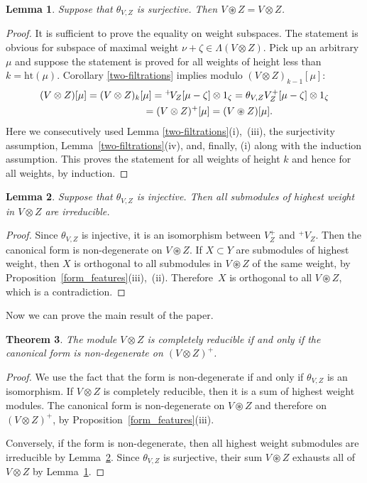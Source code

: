 \documentclass[pdftex]{sigma}
\numberwithin{equation}{section}
\newtheorem{Theorem}{Theorem}[section]
\newtheorem{Lemma}[Theorem]{Lemma}
\begin{document}
\begin{Lemma}\label{ext-tw-decomp}Suppose that $\theta_{V,Z}$ is surjective. Then $V\circledast Z=V\otimes Z$.
\end{Lemma}
\begin{proof} It is sufficient to prove the equality on weight subspaces. The statement is obvious for subspace of maximal weight $\nu+\zeta\in \Lambda(V\otimes Z)$. Pick up an arbitrary $\mu$ and suppose the statement is proved for all weights of height less than $k=\mathrm{ht}(\mu)$. Corollary \ref{two-filtrations} implies modulo $(V\otimes Z)_{k-1}[\mu]$:
\begin{gather*}
(V\otimes Z)[\mu]=(V\otimes Z)_k[\mu]={}^+\!V_Z[\mu-\zeta]\otimes 1_\zeta=\theta_{V,Z}V^+_Z[\mu-\zeta]\otimes 1_\zeta\\
\hphantom{(V\otimes Z)[\mu]}{} =(V\otimes Z)^+[\mu] =(V\circledast Z)[\mu].
\end{gather*}
Here we consecutively used Lemma \ref{two-filtrations}(i),~(iii), the surjectivity assumption, Lemma~\ref{two-filtrations}(iv), and, finally, (i) along with the induction assumption. This proves the statement for all weights of height $k$ and hence for all weights, by induction.
\end{proof}

\begin{Lemma}\label{irred} Suppose that $\theta_{V,Z} $ is injective. Then all submodules of highest weight in $V\otimes Z$ are irreducible.
\end{Lemma}
\begin{proof}Since $\theta_{V,Z} $ is injective, it is an isomorphism between $V^+_Z$ and ${}^+\!V_Z$. Then the canonical form is non-degenerate on $V\circledast Z$. If $X\subset Y$ are submodules of highest weight, then $X$ is orthogonal to all submodules in $V\circledast Z$ of the same weight, by Proposition~\ref{form_features}(iii),~(ii). Therefore~$X$ is orthogonal to all $V\circledast Z$, which is a contradiction.
\end{proof}

Now we can prove the main result of the paper.
\begin{Theorem} \label{dir-sum}The module $V\otimes Z$ is completely reducible if and only if the canonical form is non-degenerate on $(V\otimes Z)^+$.
\end{Theorem}
\begin{proof}We use the fact that the form is non-degenerate if and only if $\theta_{V,Z}$ is an isomorphism. If $V\otimes Z$ is completely reducible, then it is a sum of highest weight modules. The canonical form is non-degenerate on $V\circledast Z$ and therefore on $(V\otimes Z)^+$, by Proposition~\ref{form_features}(iii).

Conversely, if the form is non-degenerate, then all highest weight submodules are irreducible by Lemma~\ref{irred}. Since $\theta_{V,Z}$ is surjective, their sum $V\circledast Z$ exhausts all of $V\otimes Z$ by Lemma~\ref{ext-tw-decomp}.
\end{proof}
\end{document}
